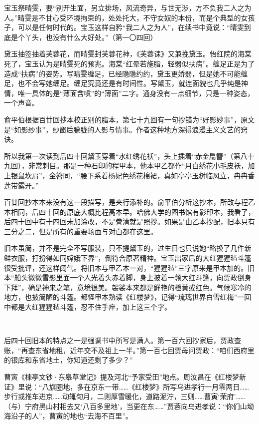 \par 宝玉祭晴雯，要“别开生面，另立排场，风流奇异，与世无涉，方不负我二人之为人。”晴雯是不甘心受环境拘束的，处处托大，不守女奴的本份，而是个典型的女孩子，可以是任何时代的。宝玉这样自矜“我二人之为人”，在续书中竟说：“晴雯到底是个丫头，也没有什么大好处。”（第一〇四回）
\par 黛玉抽签抽着芙蓉花，而晴雯封芙蓉花神，《芙蓉诔》又兼挽黛玉。怡红院的海棠死了，宝玉认为是晴雯死的预兆。海棠“红晕若施脂，轻弱似扶病”。缠足正是为了造成“扶病”的姿势。写晴雯缠足，已经隐隐约约，黛玉更娇弱，但是她不可能缠足，也不会写她缠足。缠足究竟还是有时间性。写黛玉，就连面貌也几乎纯是神情，唯一具体的是“薄面含嗔”的“薄面”二字。通身没有一点细节，只是一种姿态，一个声音。
\par 俞平伯根据百廿回抄本校正别的脂本，第七十九回有一句抄错为“好影妙事”，原文是“如影纱事”，纱窗后朦胧的人影与情事。作者这种地方深得浪漫主义文艺的窍诀。
\par 所以我第一次读到后四十回黛玉穿着“水红绣花袄”，头上插着“赤金扁簪”（第八十九回），非常刺目。那是一种石印的程甲本，他本甲乙都作“月白绣花小毛皮袄，加上银鼠坎肩”，金簪同，“腰下系着杨妃色绣花棉裙，真如亭亭玉树临风立，冉冉香莲带露开。”
\par 百廿回抄本本来没有这一段描写，是夹行添补的。俞平伯分析这抄本，所改与程乙本相同，后四十回的原底大概比程高本早。哈佛大学的图书馆有影印本，我看了，后四十回中有十四回未加涂改，不是誊清就是照抄。如果是由乙本抄配，旧本只有三分之二，但是所有的重要场面与对白都在这里。
\par 旧本虽简，并不是完全不写服装，只不提黛玉的，过生日也只说她“略换了几件新鲜衣服，打扮得如同嫦娥下界”，倒符合原著精神。宝玉出家后的大红猩猩毡斗篷很受批评，还这样阔气。将旧本与甲乙本一对，“猩猩毡”三字原来是甲本加的。旧本“船头微微雪影里面一个人光着头赤着脚，身上披着一领大红斗篷，向贾政倒身下拜”，确是神来之笔，意境很美。袈裟本来都是鲜艳的橙黄或红色。气候寒冷的地方，也披简陋的斗篷。都怪甲本熟读《红楼梦》，记得“琉璃世界白雪红梅”一回中都是大红猩猩毡斗篷，忍不住手痒，加上这三个字。
\par  
\par 后四十回旧本的特点之一是强调书中所写是满人。第一百六回抄家后，贾政查账，“再查东省地租，近年交不及祖上一半。”第一百七回贾母问贾政：“咱们西府里的银库和东省地土，你知道还剩了多少？”
\par 曹寅《棟亭文钞·东皋草堂记》提及河北“予家受田”地点。周汝昌在《红楼梦新证》里说：“八旗圈地，多在京东一带……《红楼梦》所写乌进孝行一月零两日……步行或推车进京……动辄旬月，二则厚雪暖化，道路泥泞，三则……曹寅‘荣府’……（与）宁府黑山村相去又‘八百多里地’，当更在东……”贾蓉向乌进孝说：“你们山坳海沿子的人”，曹寅的地也“去海不百里”。
